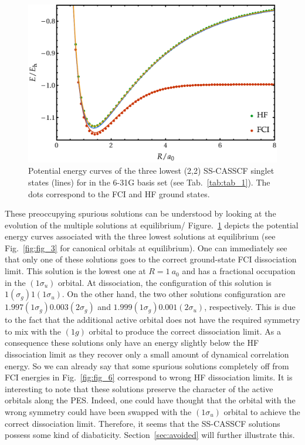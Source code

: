 \documentclass[aip,jcp,reprint,noshowkeys,superscriptaddress]{revtex4-1}
\begin{document}
\begin{figure}
  \centering
  \includegraphics[width=0.9\linewidth]{Figures/fig_5.pdf}
  \caption{Potential energy curves of the three lowest (2,2) SS-CASSCF singlet states (lines) for  in the 6-31G basis set (see Tab.~\ref{tab:tab_1}). The dots correspond to the FCI and HF ground states. \label{fig:fig_7}}
\end{figure}

These preoccupying spurious solutions can be understood by looking at the evolution of the multiple solutions at equilibrium/
Figure.~\ref{fig:fig_7} depicts the potential energy curves associated with the three lowest solutions at equilibrium (see Fig.~\ref{fig:fig_3} for canonical orbitals at equilibrium).
One can immediately see that only one of these solutions goes to the correct ground-state FCI dissociation limit.
This solution is the lowest one at $R=1~a_0$ and has a fractional occupation in the $(1\sigma_u)$ orbital.
At dissociation, the configuration of this solution is $1(\sigma_g)1(1\sigma_u)$.
On the other hand, the two other solutions configuration are $1.997(1\sigma_g)0.003(2\sigma_g)$ and $1.999(1\sigma_g)0.001(2\sigma_u)$, respectively.
This is due to the fact that the additional active orbital does not have the required symmetry to mix with the $(1g)$ orbital to produce the correct dissociation limit.
As a consequence these solutions only have an energy slightly below the HF dissociation limit as they recover only a small amount of dynamical correlation energy.
So we can already say that some spurious solutions completely off from FCI energies in Fig.~\ref{fig:fig_6} correspond to wrong HF dissociation limits.
It is interesting to note that these solutions preserve the character of the active orbitals along the PES.
Indeed, one could have thought that the orbital with the wrong symmetry could have been swapped with the $(1\sigma_u)$ orbital to achieve the correct dissociation limit.
Therefore, it seems that the SS-CASSCF solutions possess some kind of diabaticity.
Section~\ref{sec:avoided} will further illustrate this.
\end{document}
